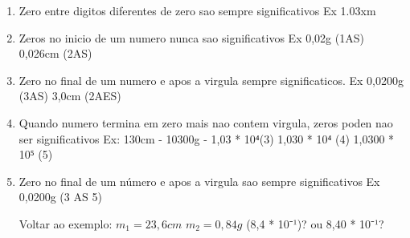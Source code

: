 \documentclass[a4paper,12pt]{article}
\begin{document}
\begin{enumerate}
\item Zero entre digitos diferentes de zero sao sempre significativos
  Ex 1.03xm
\item Zeros no inicio de um numero nunca sao significativos
  Ex 0,02g (1AS)
     0,026cm (2AS)

\item Zero no final de um numero e apos a virgula sempre significaticos.
Ex 0,0200g (3AS)
3,0cm (2AES)

\item Quando numero termina em zero mais nao contem virgula, zeros poden nao ser significativos
Ex:
  130cm - 
  10300g - 1,03 * 10⁴(3)
           1,030 * 10⁴ (4)
           1,0300 * 10⁵ (5)

\item Zero no final de um número e apos a virgula sao sempre significativos
Ex   0,0200g (3 AS 5)

Voltar ao exemplo:
$m_1 = 23,6cm$
$m_2 = 0,84g$ (8,4 * 10⁻¹)? ou 8,40 * 10⁻¹?
\end{enumerate}
\end{document}
